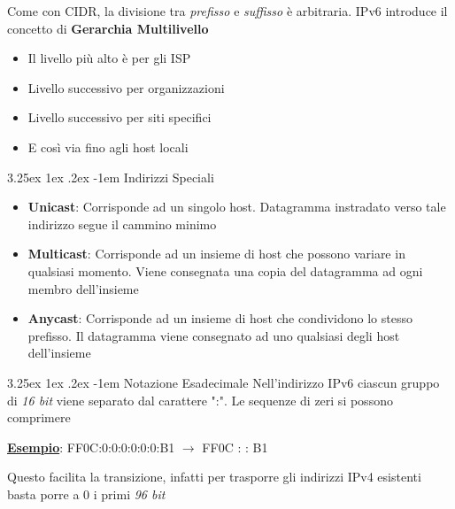 \documentclass{article}
\makeatletter
\newcounter{subsubsubsection}[subsubsection]
\renewcommand\paragraph{\@startsection{paragraph}{5}{\z@}%
  {3.25ex \@plus1ex \@minus.2ex}%
  {-1em}%
  {\normalfont\normalsize\bfseries}}
\makeatother
\begin{document}
                    Come con CIDR, la divisione tra \textit{prefisso} e \textit{suffisso} è arbitraria. IPv6 introduce il concetto di \textbf{Gerarchia Multilivello}
                    \begin{itemize}
                        \item Il livello più alto è per gli ISP
                        \item Livello successivo per organizzazioni
                        \item Livello successivo per siti specifici
                        \item E così via fino agli host locali
                    \end{itemize}

                    \paragraph{Indirizzi Speciali}
                        \begin{itemize}
                            \item \textbf{Unicast}: Corrisponde ad un singolo host. Datagramma instradato verso tale indirizzo segue il cammino minimo
                            \item \textbf{Multicast}: Corrisponde ad un insieme di host che possono variare in qualsiasi momento. Viene consegnata una copia del datagramma ad ogni membro dell'insieme
                            \item \textbf{Anycast}: Corrisponde ad un insieme di host che condividono lo stesso prefisso. Il datagramma viene consegnato ad uno qualsiasi degli host dell'insieme
                        \end{itemize}

                    \paragraph{Notazione Esadecimale}
                        Nell'indirizzo IPv6 ciascun gruppo di \textit{16 bit} viene separato dal carattere ":". Le sequenze di zeri si possono comprimere
                        \begin{center}
                            \underline{\textbf{Esempio}}: FF0C:0:0:0:0:0:0:B1 $ \rightarrow $ FF0C : : B1
                        \end{center}
                        Questo facilita la transizione, infatti per trasporre gli indirizzi IPv4 esistenti basta porre a 0 i primi \textit{96 bit}
\end{document}

